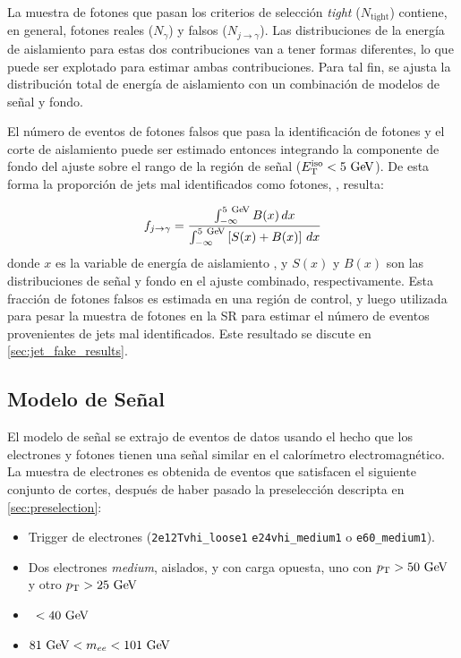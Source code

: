 La muestra de fotones que pasan los criterios de selección \emph{tight}
($N_\text{tight}$) contiene, en general, fotones reales ($N_{\gamma}$) y falsos
($N_{j\to\gamma}$). Las distribuciones de la energía de aislamiento para estas
dos contribuciones van a tener formas diferentes, lo que puede ser explotado
para estimar ambas contribuciones. Para tal fin, se ajusta la distribución
total de energía de aislamiento con un combinación de modelos de señal y fondo.


El número de eventos de fotones falsos que pasa la identificación de fotones y
el corte de aislamiento puede ser estimado entonces integrando la componente de
fondo del ajuste sobre el rango de la región de señal ($\etiso<5\GeV$). De esta
forma la proporción de jets mal identificados como fotones, \fjg, resulta:

\begin{equation}\label{eq:jfake_formula}
  f_{j\to \gamma} = \frac{\int_{-\infty}^{5\gev} B(x)\, dx}{\int_{-\infty}^{5\gev} \left[S(x)+B(x)\right]\, dx}
\end{equation}
%
donde $x$ es la variable de energía de aislamiento \etiso, y $S(x)$ y $B(x)$
son las distribuciones de señal y fondo en el ajuste combinado, respectivamente.
Esta fracción de fotones falsos es estimada en una región de control, y luego
utilizada para pesar la muestra de fotones en la SR para estimar el número de
eventos provenientes de jets mal identificados. Este resultado se discute en
\cref{sec:jet_fake_results}.



\subsection{Modelo de Señal} \label{sec:jfake_sig_template}

El modelo de señal se extrajo de eventos de datos {\Zee} usando el hecho que los
electrones y fotones tienen una señal similar en el calorímetro
electromagnético. La muestra de electrones es obtenida de eventos que satisfacen
el siguiente conjunto de cortes, después de haber pasado la preselección
descripta en \cref{sec:preselection}:

\begin{itemize}\itemsep0.1cm
\item Trigger de electrones (\texttt{2e12Tvhi\_loose1} \texttt{e24vhi\_medium1} o
  \texttt{e60\_medium1}).
\item Dos electrones \emph{medium}, aislados, y con carga opuesta, uno con $\pt>50\gev$
  y otro $\pt>25 \gev$
\item \MET\ $<40\gev$
\item $81\gev<m_{ee}<101\gev$
\end{itemize}

